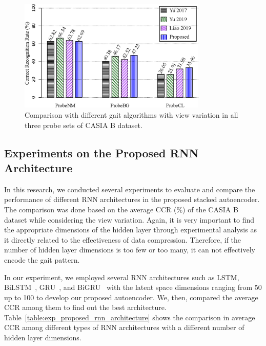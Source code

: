 \begin{figure}
	\centering
	\includegraphics[width = 0.8\textwidth]{figures/comp_casia_b_with_view.eps}
	\caption [Comparison with different gait algorithms with view variation in all three probe sets of CASIA B dataset.]
	{Comparison with different gait algorithms with view variation in all three probe sets of CASIA B dataset.  \label{fig:comp_casia_b_with_view}
	}
	
\end{figure}


\subsection{Experiments on the Proposed RNN Architecture} \label{sec:exp_proposed_rnn_arch}
In this research, we conducted several experiments to evaluate and compare the performance of different RNN architectures in the proposed stacked autoencoder. The comparison was done based on the average CCR (\%) of the CASIA B dataset while considering the view variation. Again, it is very important to find the appropriate dimensions of the hidden layer through experimental analysis as it directly related to the effectiveness of data compression. Therefore, if the number of hidden layer dimensions is too few or too many, it can not effectively encode the gait pattern. 

In our experiment, we employed several RNN architectures such as LSTM, BiLSTM~\cite{Graves_05}, GRU~\cite{Chung_14}, and BiGRU~\cite{Schuster_97} with the latent space dimensions ranging from 50 up to 100 to develop our proposed autoencoder. We, then, compared the average CCR among them to find out the best architecture. Table~\ref{table:exp_proposed_rnn_architecture} shows the comparison in average CCR among different types of RNN architectures with a different number of hidden layer dimensions.

